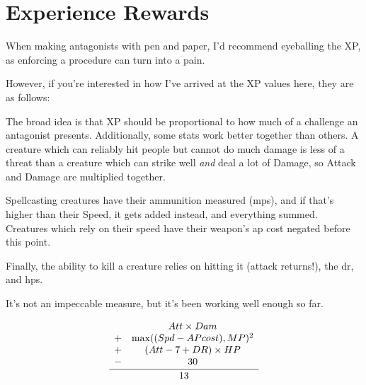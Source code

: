 \chapter{Experience Rewards}

\begin{multicols}{2}

\noindent When making antagonists with pen and paper, I'd recommend eyeballing the XP, as enforcing a procedure can turn into a pain.

However, if you're interested in how I've arrived at the XP values here, they are as follows:

The broad idea is that XP should be proportional to how much of a challenge an antagonist presents.
Additionally, some stats work better together than others.
A creature which can reliably hit people but cannot do much damage is less of a threat than a creature which can strike well \emph{and} deal a lot of Damage, so Attack and Damage are multiplied together.

Spellcasting creatures have their ammunition measured (\glspl{mp}), and if that's higher than their Speed, it gets added instead, and everything summed.
Creatures which rely on their speed have their weapon's \gls{ap} cost negated before this point.

Finally, the ability to kill a creature relies on hitting it (attack returns!), the \gls{dr}, and \glspl{hp}.

It's not an impeccable measure, but it's been working well enough so far.

\end{multicols}

\begin{equation}
\frac{
    \begin{array}[b]{lc}
        & Att \times Dam \\
      + & \max( (Spd - AP cost), MP )^2 \\
      + & (Att - 7 + DR) \times HP\\
      - & 30
    \end{array}
  }{
    13
  }
\end{equation}

